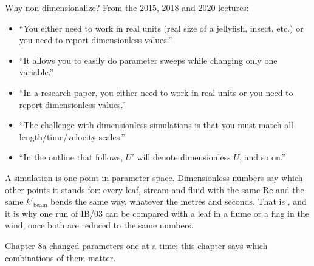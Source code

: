 \documentclass[aspectratio=169,11pt]{beamer}
\begin{document}
\begin{frame}{Why non-dimensionalize?}
\label{fr:why}
\small From the 2015, 2018 and 2020 lectures:
\begin{itemize}
  \item ``You either need to work in real units (real size of a jellyfish, insect, etc.) or you need to report dimensionless values.''
  \item ``It allows you to easily do parameter sweeps while changing only one variable.''
  \item ``In a research paper, you either need to work in real units or you need to report dimensionless values.''
  \item ``The challenge with dimensionless simulations is that you must match all length/time/velocity scales.''
  \item ``In the outline that follows, $U'$ will denote dimensionless $U$, and so on.''
\end{itemize}
\vspace{1mm}
\begin{punchbox}
\small A simulation is one point in parameter space. Dimensionless numbers say which other points it stands for: every leaf, stream and fluid with the same $\mathrm{Re}$ and the same $k'_{\mathrm{beam}}$ bends the same way, whatever the metres and seconds. That is , and it is why one run of IB/03 can be compared with a leaf in a flume or a flag in the wind, once both are reduced to the same numbers.
\end{punchbox}
\vspace{1mm}
\small Chapter 8a changed parameters one at a time; this chapter says which combinations of them matter.
\end{frame}
\end{document}
